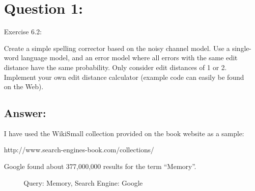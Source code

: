 \section*{Question 1:}
Exercise 6.2: 

Create a simple spelling corrector based on the noisy channel model. Use a single-word language model, and an error model where all errors with the same edit distance have the same probability. Only consider edit distances of 1 or 2. Implement your own edit distance calculator (example code can easily be found on the Web).

\subsection*{Answer:}
I have used the WikiSmall collection provided on the book website as a sample:

http://www.search-engines-book.com/collections/



\pagebreak
Google found about 377,000,000 results for the term ``Memory''.
\begin{figure}[h]
\caption{Query: Memory, Search Engine: Google}
\centering
\end{figure}
